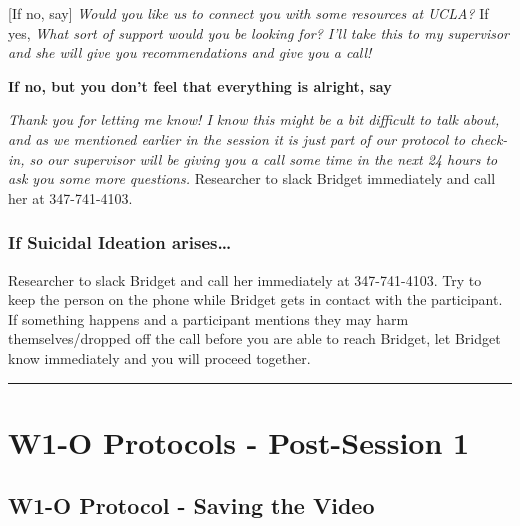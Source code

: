 \documentclass[]{book}
\begin{document}
{[}If no, say{]} \emph{Would you like us to connect you with some resources at UCLA?} If yes, \emph{What sort of support would you be looking for? I'll take this to my supervisor and she will give you recommendations and give you a call!}

\textbf{If no, but you don't feel that everything is alright, say}

\emph{Thank you for letting me know! I know this might be a bit difficult to talk about, and as we mentioned earlier in the session it is just part of our protocol to check-in, so our supervisor will be giving you a call some time in the next 24 hours to ask you some more questions.} Researcher to slack Bridget immediately and call her at 347-741-4103.

\hypertarget{if-suicidal-ideation-arises}{%
\subsubsection{If Suicidal Ideation arises\ldots{}}\label{if-suicidal-ideation-arises}}

Researcher to slack Bridget and call her immediately at 347-741-4103. Try to keep the person on the phone while Bridget gets in contact with the participant. If something happens and a participant mentions they may harm themselves/dropped off the call before you are able to reach Bridget, let Bridget know immediately and you will proceed together.

\begin{center}\rule{0.5\linewidth}{0.5pt}\end{center}

\hypertarget{w1-o-protocols---post-session-1}{%
\section{W1-O Protocols - Post-Session 1}\label{w1-o-protocols---post-session-1}}

\hypertarget{w1-o-protocol---saving-the-video}{%
\subsection{W1-O Protocol - Saving the Video}\label{w1-o-protocol---saving-the-video}}
\end{document}
